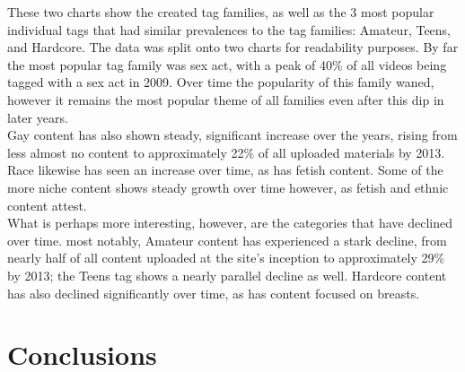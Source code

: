 \documentclass[11pt,]{article}
\begin{document}
These two charts show the created tag families, as well as the 3 most
popular individual tags that had similar prevalences to the tag
families: Amateur, Teens, and Hardcore. The data was split onto two
charts for readability purposes. By far the most popular tag family was
sex act, with a peak of 40\% of all videos being tagged with a sex act
in 2009. Over time the popularity of this family waned, however it
remains the most popular theme of all families even after this dip in
later years.\\
Gay content has also shown steady, significant increase over the years,
rising from less almost no content to approximately 22\% of all uploaded
materials by 2013. Race likewise has seen an increase over time, as has
fetish content. Some of the more niche content shows steady growth over
time however, as fetish and ethnic content attest.\\
What is perhaps more interesting, however, are the categories that have
declined over time. most notably, Amateur content has experienced a
stark decline, from nearly half of all content uploaded at the site's
inception to approximately 29\% by 2013; the Teens tag shows a nearly
parallel decline as well. Hardcore content has also declined
significantly over time, as has content focused on breasts.

\section{Conclusions}\label{conclusions}



\renewcommand\refname{References}

\end{document}
